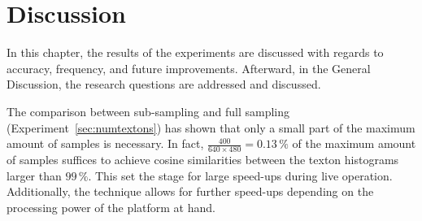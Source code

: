 \chapter{Discussion}
\label{chap:discussion}

In this chapter, the results of the experiments are discussed with regards to accuracy, frequency, and future improvements. Afterward, in the General Discussion, the research questions are addressed and discussed.

The comparison between sub-sampling and full sampling (Experiment~\ref{sec:numtextons}) has shown that only a small part of the maximum amount of
samples is necessary. In fact, $\frac{400}{640 \times 480} = 0.13\,\%$ of the maximum amount of samples suffices to achieve cosine similarities between the texton histograms larger than $99\,\%$. This set the stage for
large speed-ups during live operation. Additionally, the technique allows for further speed-ups depending on the processing power of the platform at hand.

